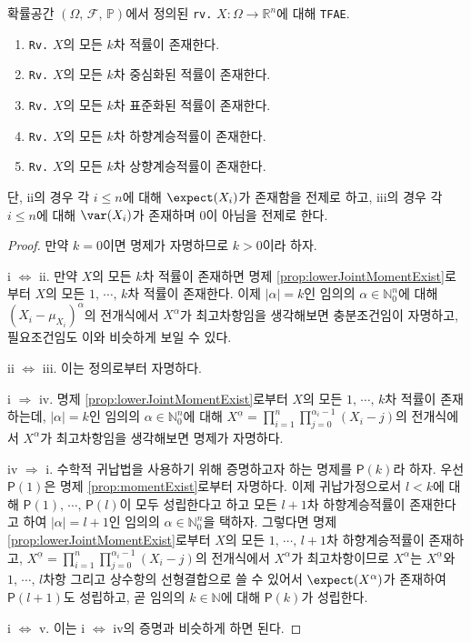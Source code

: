 \begin{proposition}
    확률공간 $(\Omega,\,\mathcal{F},\,\mathbb{P})$에서 정의된 \texttt{rv.} $X:\Omega\to\mathbb{R}^n$에 대해 \texttt{TFAE}.
    \begin{enumerate}
        \item \texttt{Rv.} $X$의 모든 $k$차 적률이 존재한다.
        \item \texttt{Rv.} $X$의 모든 $k$차 중심화된 적률이 존재한다.
        \item \texttt{Rv.} $X$의 모든 $k$차 표준화된 적률이 존재한다.
        \item \texttt{Rv.} $X$의 모든 $k$차 하향계승적률이 존재한다.
        \item \texttt{Rv.} $X$의 모든 $k$차 상향계승적률이 존재한다.
    \end{enumerate}
    단, ii의 경우 각 $i\leq n$에 대해 $\expect(X_i)$가 존재함을 전제로 하고, iii의 경우 각 $i\leq n$에 대해 $\var(X_i)$가 존재하며 $0$이 아님을 전제로 한다.
\end{proposition}

\begin{proof}
    만약 $k=0$이면 명제가 자명하므로 $k>0$이라 하자.

    i $\Leftrightarrow$ ii. 만약 $X$의 모든 $k$차 적률이 존재하면 명제 \ref{prop:lowerJointMomentExist}로부터 $X$의 모든 $1,\,\cdots,\,k$차 적률이 존재한다. 이제 $|\alpha|=k$인 임의의 $\alpha\in\mathbb{N}_0^n$에 대해 $(X_i-\mu_{X_i})^\alpha$의 전개식에서 $X^\alpha$가 최고차항임을 생각해보면 충분조건임이 자명하고, 필요조건임도 이와 비슷하게 보일 수 있다.

    ii $\Leftrightarrow$ iii. 이는 정의로부터 자명하다.

    i $\Rightarrow$ iv. 명제 \ref{prop:lowerJointMomentExist}로부터 $X$의 모든 $1,\,\cdots,\,k$차 적률이 존재하는데, $|\alpha|=k$인 임의의 $\alpha\in\mathbb{N}_0^n$에 대해 $X^{\underline{\alpha}}=\prod_{i=1}^n\prod_{j=0}^{\alpha_i-1}(X_i-j)$의 전개식에서 $X^\alpha$가 최고차항임을 생각해보면 명제가 자명하다.

    iv $\Rightarrow$ i. 수학적 귀납법을 사용하기 위해 증명하고자 하는 명제를 $\mathsf{P}(k)$라 하자. 우선 $\mathsf{P}(1)$은 명제 \ref{prop:momentExist}로부터 자명하다. 이제 귀납가정으로서 $l<k$에 대해 $\mathsf{P}(1),\,\cdots,\,\mathsf{P}(l)$이 모두 성립한다고 하고 모든 $l+1$차 하향계승적률이 존재한다고 하여 $|\alpha|=l+1$인 임의의 $\alpha\in\mathbb{N}_0^n$을 택하자. 그렇다면 명제 \ref{prop:lowerJointMomentExist}로부터 $X$의 모든 $1,\,\cdots,\,l+1$차 하향계승적률이 존재하고, $X^{\underline{\alpha}}=\prod_{i=1}^n\prod_{j=0}^{\alpha_i-1}(X_i-j)$의 전개식에서 $X^\alpha$가 최고차항이므로 $X^\alpha$는 $X^{\underline{\alpha}}$와 $1,\,\cdots,\,l$차항 그리고 상수항의 선형결합으로 쓸 수 있어서 $\expect(X^\alpha)$가 존재하여 $\mathsf{P}(l+1)$도 성립하고, 곧 임의의 $k\in\mathbb{N}$에 대해 $\mathsf{P}(k)$가 성립한다.

    i $\Leftrightarrow$ v. 이는 i $\Leftrightarrow$ iv의 증명과 비슷하게 하면 된다.
\end{proof}

